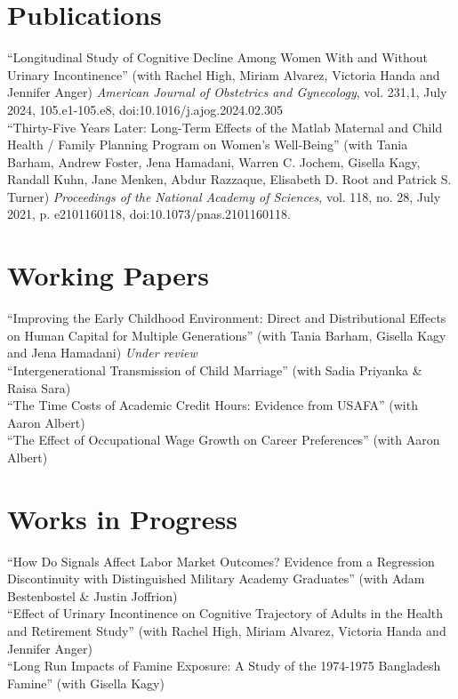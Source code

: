 \documentclass[letterpaper]{article}
\begin{document}
\section*{Publications}
``Longitudinal Study of Cognitive Decline Among Women With and Without Urinary Incontinence'' (with Rachel High, Miriam Alvarez, Victoria Handa and Jennifer Anger)  \textit{American Journal of Obstetrics and Gynecology}, vol. 231,1, July 2024, 105.e1-105.e8, doi:10.1016/j.ajog.2024.02.305
\\[.5em]
``Thirty-Five Years Later: Long-Term Effects of the Matlab Maternal and Child Health / Family Planning Program on Women's Well-Being'' (with Tania Barham, Andrew Foster, Jena Hamadani, Warren C. Jochem, Gisella Kagy, Randall Kuhn, Jane Menken, Abdur Razzaque, Elisabeth D. Root and Patrick S. Turner) \textit{Proceedings of the National Academy of Sciences}, vol. 118, no. 28, July 2021, p. e2101160118, doi:10.1073/pnas.2101160118.

\section*{Working Papers}
``Improving the Early Childhood Environment: Direct and Distributional Effects on Human Capital for Multiple Generations'' (with Tania Barham, Gisella Kagy and Jena Hamadani) \textit{Under review}
\\[.5em]
``Intergenerational Transmission of Child Marriage'' (with Sadia Priyanka \& Raisa Sara)
\\[.5em]
``The Time Costs of Academic Credit Hours: Evidence from USAFA'' (with Aaron Albert)
\\[.5em]
``The Effect of Occupational Wage Growth on Career Preferences'' (with Aaron Albert)

\section*{Works in Progress}
``How Do Signals Affect Labor Market Outcomes? Evidence from a Regression Discontinuity with Distinguished Military Academy Graduates'' (with Adam Bestenbostel \& Justin Joffrion)
\\[.5em]
``Effect of Urinary Incontinence on Cognitive Trajectory of Adults in the Health and Retirement Study'' (with Rachel High, Miriam Alvarez, Victoria Handa and Jennifer Anger)
\\[.5em]
``Long Run Impacts of Famine Exposure: A Study of the 1974-1975 Bangladesh Famine'' (with Gisella Kagy)
\end{document}
